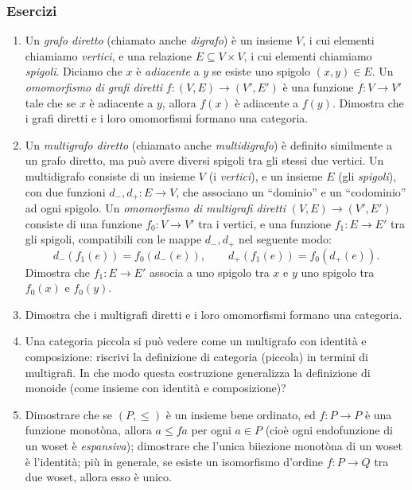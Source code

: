 \subsubsection*{Esercizi}
\begin{enumerate}
	\item Un \emph{grafo diretto} (chiamato anche \emph{digrafo}) è un insieme \(V\), i cui elementi chiamiamo \emph{vertici}, e una relazione \(E\subseteq V\times V\), i cui elementi chiamiamo \emph{spigoli}. Diciamo che \(x\) è \emph{adiacente} a \(y\) se esiste uno spigolo \((x,y)\in E\). Un \emph{omomorfismo di grafi diretti} \(f:(V,E)\to (V',E')\) è una funzione \(f:V\to V'\) tale che se \(x\) è adiacente a \(y\), allora \(f(x)\) è adiacente a \(f(y)\). Dimostra che i grafi diretti e i loro omomorfismi formano una categoria.
	\item Un \emph{multigrafo diretto} (chiamato anche \emph{multidigrafo}) è definito similmente a un grafo diretto, ma può avere diversi spigoli tra gli stessi due vertici. Un multidigrafo consiste di un insieme \(V\) (i \emph{vertici}), e un insieme \(E\) (gli \emph{spigoli}), con due funzioni \(d_-,d_+:E\to V\), che associano un ``dominio'' e un ``codominio'' ad ogni spigolo. Un \emph{omomorfismo di multigrafi diretti} \((V,E)\to (V',E')\) consiste di una funzione \(f_0:V\to V'\) tra i vertici, e una funzione \(f_1:E\to E'\) tra gli spigoli, compatibili con le mappe \(d_-,d_+\) nel seguente modo:
	      \[
		      d_-(f_1(e)) = f_0(d_-(e)) ,\qquad d_+(f_1(e)) = f_0(d_+(e)) .
	      \]
	      Dimostra che \(f_1:E\to E'\) associa a uno spigolo tra \(x\) e \(y\) uno spigolo tra \(f_0(x)\) e \(f_0(y)\).
	\item Dimostra che i multigrafi diretti e i loro omomorfismi formano una categoria.
	\item Una categoria piccola si può vedere come un multigrafo con identità e composizione: riscrivi la definizione di categoria (piccola) in termini di multigrafi.  In che modo questa costruzione generalizza la definizione di monoide (come insieme con identità e composizione)?
	\item Dimostrare che  se \((P,\le)\) è un insieme bene ordinato, ed \(f : P\to P\) è una funzione monotòna, allora \(a\le fa\) per ogni \(a\in P\) (cioè ogni endofunzione di un woset è \emph{espansiva}); dimostrare che l'unica biiezione monotòna di un woset è l'identità; più in generale, se esiste un isomorfismo d'ordine \(f : P\to Q\) tra due woset, allora esso è unico.
\end{enumerate}

